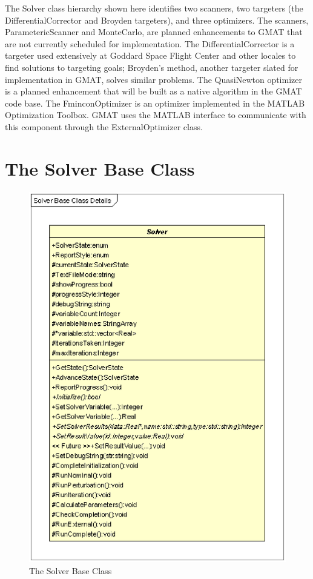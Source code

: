 The Solver class hierarchy shown here identifies two scanners, two targeters (the
DifferentialCorrector and Broyden targeters), and three optimizers.  The scanners,
ParametericScanner and MonteCarlo, are planned enhancements to GMAT that are not currently scheduled
for implementation.  The DifferentialCorrector is a targeter used extensively at Goddard Space
Flight Center and other locales to find solutions to targeting goals; Broyden's method, another
targeter slated for implementation in GMAT, solves similar problems.  The 
QuasiNewton optimizer is a planned enhancement that will be built as a native algorithm in the
GMAT code base.  The FminconOptimizer is an optimizer implemented in the MATLAB Optimization
Toolbox.  GMAT uses the MATLAB interface to communicate with this component through the
ExternalOptimizer class.

\section{The Solver Base Class}

\begin{figure}[ht]
\begin{center}
\includegraphics[scale=0.5]{Images/SolverBaseClassDetails.eps}
\caption{\label{figure:SolverBaseClass}The Solver Base Class}
\end{center}
\end{figure}

